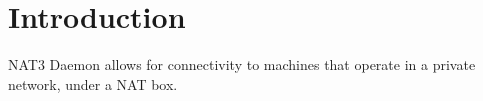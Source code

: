 \section{Introduction}

NAT3 Daemon allows for connectivity to machines that operate in a private network, under a NAT box.
